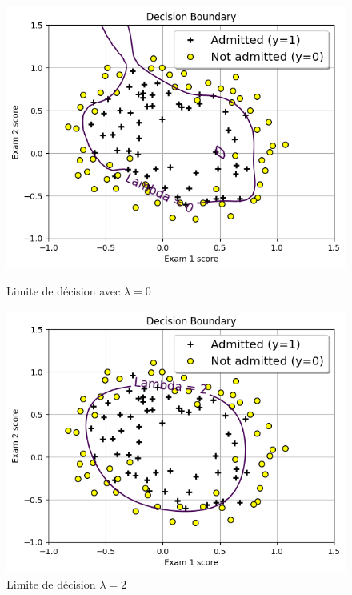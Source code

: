 \begin{figure}[!h]
    \begin{minipage}{.48\linewidth}
        \begin{center}
            \includegraphics[width=1\textwidth]{./img/4.5(1).png}
            \caption{\label{fig:4.5(1)}Limite de décision avec $\lambda=0$}  
        \end{center}
    \end{minipage}\hfill
    \begin{minipage}{.48\linewidth}
        \begin{center}
            \includegraphics[width=1\textwidth]{./img/4.5(2).png}
            \caption{\label{fig:4.5(2)}Limite de décision $\lambda=2$}  
        \end{center}
    \end{minipage}
\end{figure}

